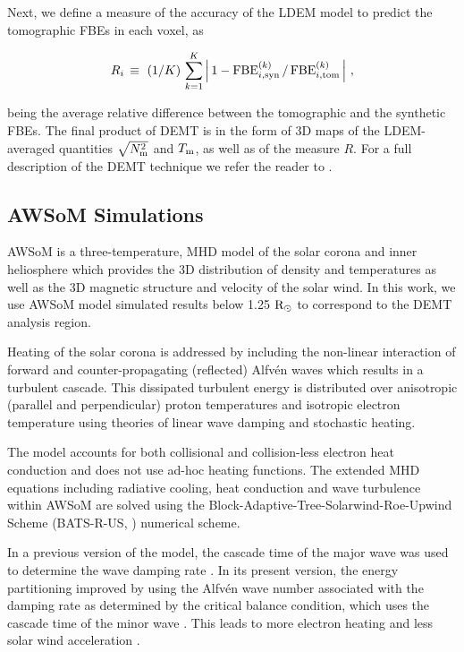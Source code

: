 \documentclass[namedreferences]{solarphysics}
\newcommand{\mrsun}{{\rm R_\odot}}
\newcommand{\FBE}{{\rm FBE}}
\newcommand{\Tm}{T_{\rm m}}
\newcommand{\Nsqm}{N^2_{{\rm m}}}
\newcommand{\sqravgN}{\sqrt{\Nsqm}}
\begin{document}
\begin{article}
Next, we define a measure of the accuracy of the LDEM model to predict the tomographic FBEs in each voxel, as

\begin{equation}\label{R}
R_i \, \equiv \ (1/K) \, \sum_{k=1}^K \left| \, 1 - \FBE^{(k)}_{i,\rm syn}\,/\,\FBE^{(k)}_{i,\rm tom}\, \right| \,,
\end{equation}

\noindent 
{being the} average relative difference between the tomographic and the synthetic FBEs. {The final product of DEMT is in the form of 3D maps of the LDEM-averaged quantities $\sqravgN$ and $\Tm$, as well as of the measure $R$.} {For a full description of the {DEMT technique} we refer the reader to \citet{frazin_2009}.}

\subsection{{AWSoM Simulations}}\label{awsom} 

{AWSoM is a three-temperature}, MHD model of the solar corona and inner heliosphere which provides the 3D distribution of density and temperatures as well as the 3D magnetic structure and velocity of the solar wind. In this work, we use AWSoM model simulated results below 1.25 $\mrsun$ to correspond to the DEMT analysis region.

{Heating of the solar corona is addressed} by including the non-linear interaction of forward and counter-propagating (reflected) Alfv\'{e}n waves which results in a turbulent cascade. This dissipated turbulent energy is distributed over anisotropic (parallel and perpendicular) proton temperatures and isotropic electron temperature using theories of linear wave damping and stochastic heating.

{The model accounts} for both collisional and collision-less electron heat conduction and does not use ad-hoc heating functions. The extended MHD equations including radiative cooling, heat conduction and wave turbulence within AWSoM \citep{Van2014} are solved using the Block-Adaptive-Tree-Solarwind-Roe-Upwind Scheme (BATS-R-US, \citealp{Pow1999, Tot2012}) numerical scheme. 

{In a previous} version of the model, the cascade time of the major wave was used to determine the wave damping rate \citep{Cha2011, Van2014}. {In its present version, the energy partitioning  improved} by using the Alfv\'{e}n wave number associated with the damping rate as determined by the critical balance condition, which uses the cascade time of the minor wave \citep{Lit2007}. This leads to more electron heating and less solar wind acceleration \citep{Van2019b}.


\end{article}
\end{document}
